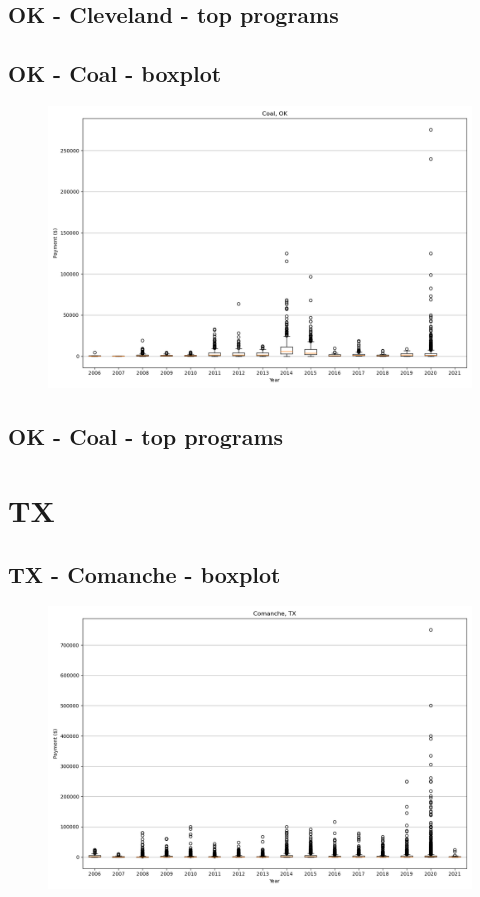\subsection*{OK - Cleveland - top programs}

\newpage
\subsection*{OK - Coal - boxplot}
\begin{figure}[h]
\centering
\includegraphics[width=7in]{../output/boxplots/counties/Coal-OK_boxplot.png}
\end{figure}


\subsection*{OK - Coal - top programs}

\newpage
\section*{TX}
\subsection*{TX - Comanche - boxplot}
\begin{figure}[h]
\centering
\includegraphics[width=7in]{../output/boxplots/counties/Comanche-TX_boxplot.png}
\end{figure}


